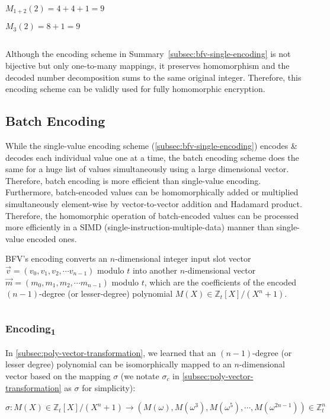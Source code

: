$M_{1+2}(2) = 4 + 4 + 1 = 9$

$M_{3}(2) = 8 + 1 = 9$

$ $

Although the encoding scheme in Summary~\ref*{subsec:bfv-single-encoding} is not bijective but only one-to-many mappings, it preserves homomorphism and the decoded number decomposition sums to the same original integer. Therefore, this encoding scheme can be validly used for fully homomorphic encryption.


\subsection{Batch Encoding}
\label{subsec:bfv-batch-encoding}

While the single-value encoding scheme (\autoref{subsec:bfv-single-encoding}) encodes \& decodes each individual value one at a time, the batch encoding scheme does the same for a huge list of values simultaneously using a large dimensional vector. Therefore, batch encoding is more efficient than single-value encoding. Furthermore, batch-encoded values can be homomorphically added or multiplied simultaneously element-wise by vector-to-vector addition and Hadamard product. Therefore, the homomorphic operation of batch-encoded values can be processed more efficiently in a SIMD (single-instruction-multiple-data) manner than single-value encoded ones. 

BFV's encoding converts an $n$-dimensional integer input slot vector $\vec{v} = (v_0, v_1, v_2, \cdots v_{n-1})$ modulo $t$ into another $n$-dimensional vector $\vec{m} = (m_0, m_1, m_2, \cdots m_{n-1})$ modulo $t$, which are the coefficients of the encoded $(n-1)$-degree (or lesser-degree) polynomial $M(X) \in \mathbb{Z}_t[X] / (X^n + 1)$. 

$ $

\subsubsection{\textsf{Encoding\textsubscript{1}}}  
\label{subsubsec:bfv-encoding-1} 

In \autoref{subsec:poly-vector-transformation}, we learned that an $(n-1)$-degree (or lesser degree) polynomial can be isomorphically mapped to an $n$-dimensional vector based on the mapping $\sigma$ (we notate $\sigma_c$ in \autoref{subsec:poly-vector-transformation} as $\sigma$ for simplicity): 

$\sigma: M(X) \in \mathbb{Z}_t[X]/(X^n + 1) \longrightarrow  (M(\omega),M(\omega^3),M(\omega^5), \cdots, M(\omega^{2n-1})) \in \mathbb{Z}_t^n$

